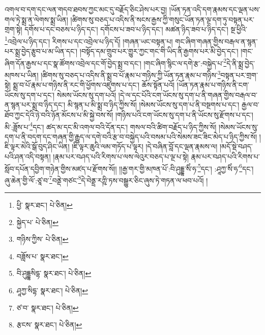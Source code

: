 འགལ་བ་དག་དང་ལན་གདབ་ཐབས་ཀྱང་མང་དུ་བརྗོད་ཅིང་ཤེས་པར་བྱ། །ཡོན་ཏན་འདི་དག་རྣམས་དང་ལྡན་པས་གལ་ཏེ་སྨྲ་ན་ལེགས་སྨྲ་ཡིན། །ཚིགས་སུ་བཅད་པ་འདིས་ནི་སངས་རྒྱས་ཀྱི་གསུང་ཡོན་ཏན་ལྔ་དག་ཏུ་བསྟན་པར་གྲག་སྟེ། དགོས་པ་དང་བཅས་པ་ཉིད་དང་། དགོངས་པ་ཟབ་པ་ཉིད་དང་། མཚན་ཉིད་ཟབ་པ་ཉིད་དང་། སྔ་ཕྱིའི་\footnote{ཕྱི་  སྣར་ཐང་།  པེ་ཅིན། }འབྲེལ་པ་ཉིད་དང་། རིགས་པ་དང་འབྲེལ་པ་ཉིད་དོ། །གཞན་ཡང་བསྟན་པ། གང་ཞིག་གཞན་གྱིས་བརྒལ་ན་སྙན་པར་སྨྲ་བྱེད་རྩུབ་པ་མ་ཡིན་དང་། །བསྟོད་དམ་གྲུབ་པར་གྱུར་ཀྱང་གང་གི་ཡིད་ནི་རྒྱགས་པར་མི་བྱེད་དང་། །གང་ཞིག་དོན་རྒྱས་པ་དང་སྣ་ཚོགས་འབྲེལ་དང་གོ་བྱེད་སྨྲ་བ་དང་། །གང་ཞིག་སྙིང་ལ་དགེ་རྩ་:བསྐྱེད་པ་\footnote{སྐྱེད་པ་  པེ་ཅིན། }དེ་ནི་སྨྲ་བྱེད་མཁས་པ་ཡིན། །ཚིགས་སུ་བཅད་པ་འདིས་ནི་སྨྲ་བ་པོ་རྣམ་པ་གཉིས་ཀྱི་ཡོན་ཏན་རྣམ་པ་གཉིས་\footnote{གཉིས་ཀྱིས་  པེ་ཅིན། }བསྟན་པར་གྲག་སྟེ། སྨྲ་བ་པོ་རྣམ་པ་གཉིས་ནི་རང་གི་ཕྱོགས་འཛུགས་པ་དང་། ཆོས་སྟོན་པའོ། །ཡོན་ཏན་རྣམ་པ་གཉིས་ནི་ངག་ཡོངས་སུ་དག་པ་དང་། སེམས་ཡོངས་སུ་དག་པའོ། །དེ་ལ་དང་པོའི་ངག་ཡོངས་སུ་དག་པ་ནི་གཞན་གྱིས་བརྒལ་བ་ན་སྙན་པར་སྨྲ་བ་ཉིད་དང་། མི་སྙན་པ་མི་སྨྲ་བ་ཉིད་ཀྱིས་སོ། །སེམས་ཡོངས་སུ་དག་པ་ནི་བསྔགས་པ་དང་། རྒྱལ་བ་ཐོབ་ཀྱང་དེའི་ཉེ་བའི་ཉོན་མོངས་པ་མི་སྐྱེ་བས་སོ། །གཉིས་པའི་ངག་ཡོངས་སུ་དག་པ་ནི་ཡོངས་སུ་རྫོགས་པ་དང་། མི་:ཟློས་པ་\footnote{བཟློས་པ་  སྣར་ཐང་། }དང་། ཚད་མ་དང་མི་འགལ་བའི་དོན་དང་། གསལ་བའི་ཚིག་བརྗོད་པ་ཉིད་ཀྱིས་སོ། །སེམས་ཡོངས་སུ་དག་པ་ནི་བདག་དང་གཞན་གྱི་རྒྱུད་ལ་དགེ་བའི་རྩ་བ་བསྐྱེད་པའི་བསམ་པའི་སེམས་ཟང་ཟིང་མེད་པ་ཉིད་ཀྱིས་སོ། །ཇི་ལྟར་མེའི་སྒོ་བུད་ཤིང་ཡིན། །ཇི་ལྟར་ཆུའི་ལམ་གཏོད་པ་ལྟར། །དེ་བཞིན་བློ་དང་ལྡན་རྣམས་ལ། །མདོ་སྡེ་བཤད་པའི་ཤན་འདི་བསྟན། །རྣམ་པར་བཤད་པའི་རིགས་པ་ལས་ལེའུར་བཅད་པ་ལྔ་པ་སྟེ། རྣམ་པར་བཤད་པའི་རིགས་པ་སློབ་དཔོན་དབྱིག་གཉེན་གྱིས་མཛད་པ་རྫོགས་སོ།། །།རྒྱ་གར་གྱི་མཁན་པོ་:བི་ཤུདྡྷ་སིཾ་ཧ་\footnote{བི་ཤུདྡྷསིདྷ་  སྣར་ཐང་།  པེ་ཅིན། }དང་། :ཤཱཀྱ་སིཾ་ཧ་\footnote{ཤཱཀྱ་སིདྷ་  སྣར་ཐང་།  པེ་ཅིན། }དང་། ཞུ་ཆེན་གྱི་ལོ་:ཙཱ་བ་\footnote{ཙ་བ་  སྣར་ཐང་།  པེ་ཅིན། }བནྡེ་གཙང་\footnote{རྩངས་  སྣར་ཐང་།  པེ་ཅིན། }དེ་བེནྡྲ་རཀྵི་ཏས་བསྒྱུར་ཅིང་ཞུས་ཏེ་གཏན་ལ་ཕབ་པའོ། ། 